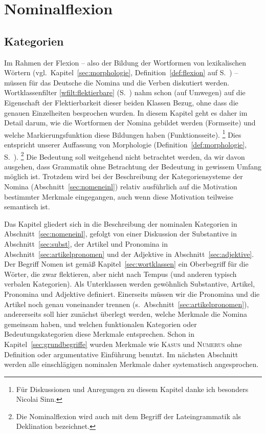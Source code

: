 \chapter{Nominalflexion}

\label{sec:nominalflexion}

\section{Kategorien}

\label{sec:kategoriennomen}

Im Rahmen der Flexion -- also der Bildung der Wortformen von lexikalischen Wörtern (vgl.\ Kapitel~\ref{sec:morphologie}, Definition~\ref{def:flexion} auf S.~\pageref{def:flexion}) -- müssen für das Deutsche die Nomina und die Verben diskutiert werden.
Wortklassenfilter \ref{wfilt:flektierbare} (S.~\pageref{wfilt:flektierbare}) nahm schon (auf Umwegen) auf die Eigenschaft der Flektierbarkeit dieser beiden Klassen Bezug, ohne dass die genauen Einzelheiten besprochen wurden.
In diesem Kapitel geht es daher im Detail darum, wie die Wortformen der Nomina gebildet werden (Formseite) und welche Markierungsfunktion diese Bildungen haben (Funktionsseite).%
\footnote{Für Diskussionen und Anregungen zu diesem Kapitel danke ich besonders Nicolai Sinn.}
Dies entspricht unserer Auffassung von Morphologie (Definition~\ref{def:morphologie}, S.~\pageref{def:morphologie}).%
\footnote{Die Nominalflexion wird auch mit dem Begriff der Lateingrammatik als Deklination bezeichnet.}
Die Bedeutung soll weitgehend nicht betrachtet werden, da wir davon ausgehen, dass Grammatik ohne Betrachtung der Bedeutung in gewissem Umfang möglich ist.
Trotzdem wird bei der Beschreibung der Kategoriensysteme der Nomina (Abschnitt~\ref{sec:nomeneinl}) relativ ausführlich auf die Motivation bestimmter Merkmale eingegangen, auch wenn diese Motivation teilweise semantisch ist.

Das Kapitel gliedert sich in die Beschreibung der nominalen Kategorien in Abschnitt~\ref{sec:nomeneinl}, gefolgt von einer Diskussion der Substantive in Abschnitt~\ref{sec:subst}, der Artikel und Pronomina in Abschnitt~\ref{sec:artikelpronomen} und der Adjektive in Abschnitt~\ref{sec:adjektive}.
Der Begriff Nomen ist gemäß Kapitel~\ref{sec:wortklassen} ein Oberbegriff für die Wörter, die zwar flektieren, aber nicht nach Tempus (und anderen typisch verbalen Kategorien).
Als Unterklassen werden gewöhnlich Substantive, Artikel, Pronomina und Adjektive definiert.
Einerseits müssen wir die Pronomina und die Artikel noch genau voneinander trennen (s.\ Abschnitt~\ref{sec:artikelpronomen}), andererseits soll hier zunächst überlegt werden, welche Merkmale die Nomina gemeinsam haben, und welchen funktionalen Kategorien oder Bedeutungskategorien diese Merkmale entsprechen.
Schon in Kapitel~\ref{sec:grundbegriffe} wurden Merkmale wie \textsc{Kasus} und \textsc{Numerus} ohne Definition oder argumentative Einführung benutzt.
Im nächsten Abschnitt werden alle einschlägigen nominalen Merkmale daher systematisch angesprochen.

